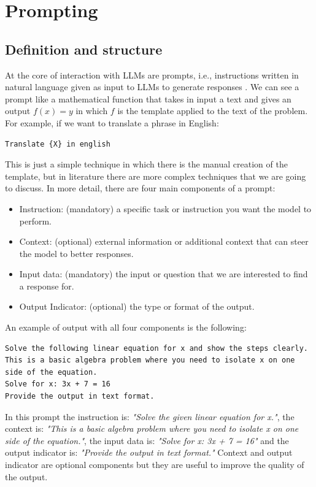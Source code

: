\section{Prompting}
\label{section:2_4_prompt_engineering}
\subsection{Definition and structure}
At the core of interaction with LLMs are prompts, i.e., instructions written in natural language given as input to LLMs to generate responses \cite{llm_prompt}.
We can see a prompt like a mathematical function that takes in input a text and gives an output $f(x) = y$ in which $f$ is the template applied to the text of the problem.
For example, if we want to translate a phrase in English:
\begin{lstlisting}
Translate {X} in english
\end{lstlisting}
This is just a simple technique in which there is the manual creation of the template, but in literature there are more complex techniques that we are going to discuss.
In more detail, there are four main components of a prompt:
\begin{itemize}
    \item Instruction: (mandatory) a specific task or instruction you want the model to perform.
    \item Context: (optional) external information or additional context that can steer the model to better responses.
    \item Input data: (mandatory) the input or question that we are interested to find a response for.
    \item Output Indicator: (optional) the type or format of the output.
\end{itemize}

An example of output with all four components is the following:
\begin{lstlisting}
Solve the following linear equation for x and show the steps clearly. 
This is a basic algebra problem where you need to isolate x on one side of the equation.
Solve for x: 3x + 7 = 16
Provide the output in text format.
\end{lstlisting}
In this prompt the instruction is: \textit{"Solve the given linear equation for x."}, the context is: \textit{"This is a basic algebra problem where you need to isolate x on one side of the equation."}, the input data is: \textit{"Solve for x: 3x + 7 = 16"} and the output indicator is: \textit{"Provide the output in text format."}
Context and output indicator are optional components but they are useful to improve the quality of the output.




